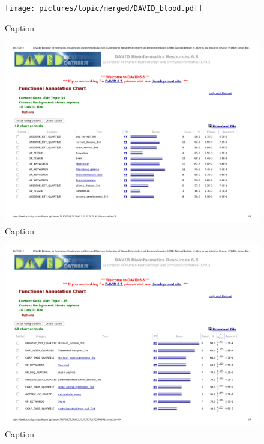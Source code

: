 \begin{figure}[htbp!]
    \centering
    \texttt{[image: pictures/topic/merged/DAVID\_blood.pdf]}
    \caption{Caption}
    \label{fig:topic/merged/DAVID_blood}
\end{figure}

\begin{figure}[htbp!]
    \centering
    \includegraphics[width=0.8\linewidth]{pictures/topic/merged/DAVID_brain.pdf}
    \caption{Caption}
    \label{fig:topic/merged/DAVID_brain}
\end{figure}

\begin{figure}[htbp!]
    \centering
    \includegraphics[width=0.8\linewidth]{pictures/topic/merged/DAVID_stomach.pdf}
    \caption{Caption}
    \label{fig:topic/merged/DAVID_stomach}
\end{figure}